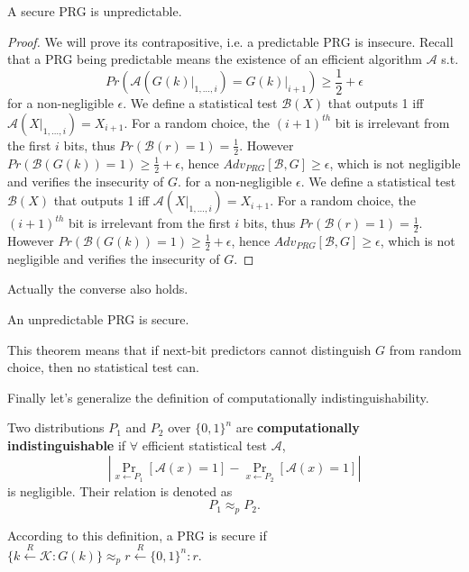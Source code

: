 \begin{theorem}
A secure PRG is unpredictable.
\end{theorem}
\begin{proof}
We will prove its contrapositive, i.e. a predictable PRG is insecure. Recall that a PRG being predictable means the existence of an efficient algorithm $\mathcal{A}$ s.t.
\begin{equation*}
Pr\left(\mathcal{A}\left(\left.G(k)\right\vert_{1,\dots,i}\right)=\left.G(k)\right\vert_{i+1}\right)\geq\frac{1}{2}+\epsilon
\end{equation*}
for a non-negligible $\epsilon$. We define a statistical test $\mathcal{B}(X)$ that outputs 1 iff $\mathcal{A}(X|_{1,\dots,i})=X_{i+1}$. For a random choice, the $(i+1)^{th}$ bit is irrelevant from the first $i$ bits, thus $Pr(\mathcal{B}(r)=1)=\frac{1}{2}.$ However $Pr(\mathcal{B}(G(k))=1)\geq \frac{1}{2}+\epsilon$, hence $Adv_{PRG}[\mathcal{B},G]\geq\epsilon$, which is not negligible and verifies the insecurity of $G$.
for a non-negligible $\epsilon$. We define a statistical test $\mathcal{B}(X)$ that outputs 1 iff $\mathcal{A}(X|_{1,\dots,i})=X_{i+1}$. For a random choice, the $(i+1)^{th}$ bit is irrelevant from the first $i$ bits, thus $Pr(\mathcal{B}(r)=1)=\frac{1}{2}.$ However $Pr(\mathcal{B}(G(k))=1)\geq \frac{1}{2}+\epsilon$, hence $Adv_{PRG}[\mathcal{B},G]\geq\epsilon$, which is not negligible and verifies the insecurity of $G$.
\end{proof}
Actually the converse also holds.
\begin{theorem}
An unpredictable PRG is secure.
\end{theorem}
This theorem means that if next-bit predictors cannot distinguish $G$ from random choice, then no statistical test can. 

Finally let's generalize the definition of computationally indistinguishability.
\begin{definition}
Two distributions $P_1$ and $P_2$ over $\{0,1\}^n$ are \textbf{computationally indistinguishable} if $\forall$ efficient statistical test $\mathcal{A}$, \[\left\lvert\mathop{Pr}\limits_{x\leftarrow P_1}[\mathcal{A}(x)=1]-\mathop{Pr}\limits_{x\leftarrow P_2}[\mathcal{A}(x)=1]\right\rvert\] is negligible. Their relation is denoted as 
\[P_1\approx_p P_2.\]
\end{definition}
According to this definition, a PRG is secure if $\{k\xleftarrow{R}\mathcal{K}:G(k)\}\approx_p r\xleftarrow{R}\{0,1\}^n:r$.
